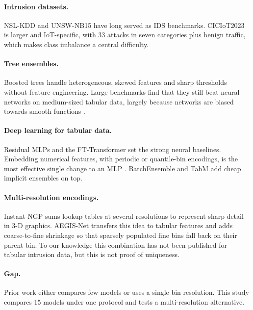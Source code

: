 \documentclass[11pt,a4paper]{article}
\newcommand{\aegis}{AEGIS-Net}
\begin{document}
\paragraph{Intrusion datasets.} NSL-KDD \cite{tavallaee2009nslkdd} and UNSW-NB15 \cite{moustafa2015unsw} have long served as IDS benchmarks. CICIoT2023 \cite{neto2023ciciot} is larger and IoT-specific, with 33 attacks in seven categories plus benign traffic, which makes class imbalance a central difficulty.

\paragraph{Tree ensembles.} Boosted trees \cite{chen2016xgboost,ke2017lightgbm,prokhorenkova2018catboost} handle heterogeneous, skewed features and sharp thresholds without feature engineering. Large benchmarks find that they still beat neural networks on medium-sized tabular data, largely because networks are biased towards smooth functions \cite{grinsztajn2022trees,shwartz2022tabular}.

\paragraph{Deep learning for tabular data.} Residual MLPs and the FT-Transformer \cite{gorishniy2021revisiting} set the strong neural baselines. Embedding numerical features, with periodic or quantile-bin encodings, is the most effective single change to an MLP \cite{gorishniy2022embeddings}. BatchEnsemble \cite{wen2020batchensemble} and TabM \cite{gorishniy2025tabm} add cheap implicit ensembles on top.

\paragraph{Multi-resolution encodings.} Instant-NGP \cite{muller2022instant} sums lookup tables at several resolutions to represent sharp detail in 3-D graphics. \aegis{} transfers this idea to tabular features and adds coarse-to-fine shrinkage so that sparsely populated fine bins fall back on their parent bin. To our knowledge this combination has not been published for tabular intrusion data, but this is not proof of uniqueness.

\paragraph{Gap.} Prior work either compares few models or uses a single bin resolution. This study compares 15 models under one protocol and tests a multi-resolution alternative.
\end{document}
